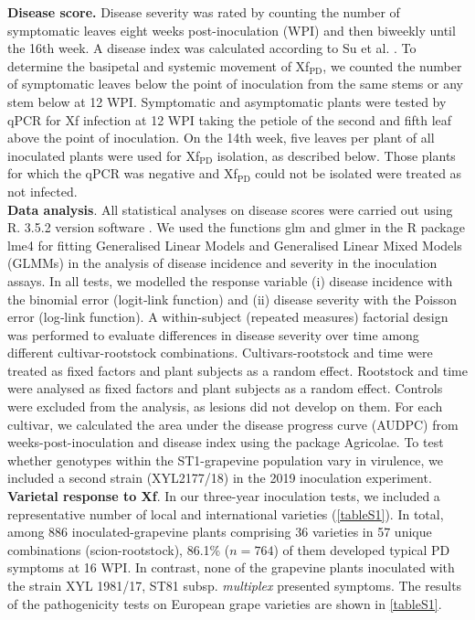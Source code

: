 \noindent\textbf{Disease score.} Disease severity was rated by counting the
number of symptomatic leaves eight weeks post-inoculation (WPI) and then
biweekly until the 16th week. A disease index was calculated according to Su et
al. \cite{Su2013}. To determine the basipetal and systemic movement of
Xf$_{\textrm{PD}}$, we counted the number of symptomatic leaves below the point
of inoculation from the same stems or any stem below at 12 WPI. Symptomatic and
asymptomatic plants were tested by qPCR for Xf infection at 12 WPI taking the
petiole of the second and fifth leaf above the point of inoculation. On the
14th week, five leaves per plant of all inoculated plants were used for
Xf$_{\textrm{PD}}$ isolation, as described below. Those plants for which the
qPCR was negative and Xf$_{\textrm{PD}}$ could not be isolated were treated as
not infected.\\

\noindent\textbf{Data analysis}. All statistical analyses on disease scores
were carried out using R. 3.5.2 version software
\cite{R-Development-Core-Team2017}. We used the functions glm and glmer in the
R package lme4 \cite{Bates2015}  for fitting Generalised Linear Models and
Generalised Linear Mixed Models (GLMMs) in the analysis of disease incidence
and severity in the inoculation assays. In all tests, we modelled the response
variable (i) disease incidence with the binomial error (logit‐link function)
and (ii) disease severity with the Poisson error (log‐link function). A
within-subject (repeated measures) factorial design was performed to evaluate
differences in disease severity over time among different cultivar-rootstock
combinations. Cultivars-rootstock and time were treated as fixed factors and
plant subjects as a random effect. Rootstock and time were analysed as fixed
factors and plant subjects as a random effect. Controls were excluded from the
analysis, as lesions did not develop on them. For each cultivar, we calculated
the area under the disease progress curve (AUDPC) from weeks-post-inoculation
and disease index using the package Agricolae. To test whether genotypes within
the ST1-grapevine population vary in virulence, we included a second strain
(XYL2177/18) in the 2019 inoculation experiment.\\

\noindent\textbf{Varietal response to Xf}. In our three-year inoculation tests,
we included a representative number of local and international varieties
(\cref{tableS1}). In total, among 886 inoculated-grapevine plants comprising 36
varieties in 57 unique combinations (scion-rootstock), 86.1\% ($n = 764$) of
them developed typical PD symptoms at 16 WPI. In contrast, none of the
grapevine plants inoculated with the strain XYL 1981/17, ST81 subsp.
\textit{multiplex} presented symptoms. The results of the pathogenicity tests
on European grape varieties are shown in \cref{tableS1}.

